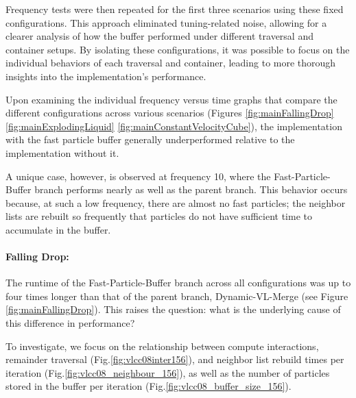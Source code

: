 Frequency tests were then repeated for the first three scenarios using these fixed configurations. This approach eliminated tuning-related noise, allowing for a clearer analysis of how the buffer performed under different traversal and container setups. By isolating these configurations, it was possible to focus on the individual behaviors of each traversal and container, leading to more thorough insights into the implementation's performance.

Upon examining the individual frequency versus time graphs that compare the different configurations across various scenarios (Figures \ref{fig:mainFallingDrop} \ref{fig:mainExplodingLiquid} \ref{fig:mainConstantVelocityCube}), the implementation with the fast particle buffer generally underperformed relative to the implementation without it.

A unique case, however, is observed at frequency 10, where the Fast-Particle-Buffer branch performs nearly as well as the parent branch. This behavior occurs because, at such a low frequency, there are almost no fast particles; the neighbor lists are rebuilt so frequently that particles do not have sufficient time to accumulate in the buffer. 


\paragraph{Falling Drop:}

The runtime of the Fast-Particle-Buffer branch across all configurations was up to four times longer than that of the parent branch, Dynamic-VL-Merge (see Figure \ref{fig:mainFallingDrop}). This raises the question: what is the underlying cause of this difference in performance? 

To investigate, we focus on the relationship between  compute interactions, remainder traversal (Fig.\ref{fig:vlcc08inter156}), and neighbor list rebuild times per iteration (Fig.\ref{fig:vlcc08_neighbour_156}), as well as the number of particles stored in the buffer per iteration (Fig.\ref{fig:vlcc08_buffer_size_156}).




